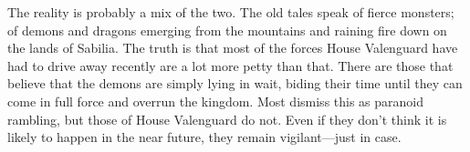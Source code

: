 \documentclass[10pt,twoside,openright,a4paper,twocolumn]{book}
\begin{document}
The reality is probably a mix of the two.  The old tales speak of fierce
monsters; of demons and dragons emerging from the mountains and raining fire
down on the lands of Sabilia.  The truth is that most of the forces House
Valenguard have had to drive away recently are a lot more petty than that.
There are those that believe that the demons are simply lying in wait, biding
their time until they can come in full force and overrun the kingdom.  Most
dismiss this as paranoid rambling, but those of House Valenguard do not.  Even
if they don't think it is likely to happen in the near future, they remain
vigilant---just in case.
\end{document}

